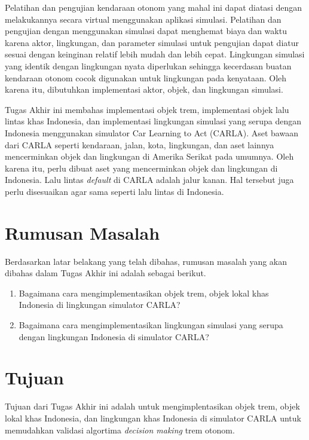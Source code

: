 Pelatihan dan pengujian kendaraan otonom yang mahal ini dapat diatasi dengan
melakukannya secara virtual menggunakan aplikasi simulasi. Pelatihan dan
pengujian dengan menggunakan simulasi dapat menghemat biaya dan waktu karena
aktor, lingkungan, dan parameter simulasi untuk pengujian dapat diatur sesuai
dengan keinginan relatif lebih mudah dan lebih cepat. Lingkungan simulasi yang
identik dengan lingkungan nyata diperlukan sehingga kecerdasan buatan kendaraan
otonom cocok digunakan untuk lingkungan pada kenyataan. Oleh karena itu,
dibutuhkan implementasi aktor, objek, dan lingkungan simulasi.

Tugas Akhir ini membahas implementasi objek trem, implementasi objek lalu lintas
khas Indonesia, dan implementasi lingkungan simulasi yang serupa dengan
Indonesia menggunakan simulator Car Learning to Act (CARLA). Aset bawaan dari
CARLA seperti kendaraan, jalan, kota, lingkungan, dan aset lainnya mencerminkan
objek dan lingkungan di Amerika Serikat pada umumnya. Oleh karena itu, perlu
dibuat aset yang mencerminkan objek dan lingkungan di Indonesia. Lalu lintas
\textit{default} di CARLA adalah jalur kanan. Hal tersebut juga perlu
disesuaikan agar sama seperti lalu lintas di Indonesia.

\section{Rumusan Masalah}

Berdasarkan latar belakang yang telah dibahas, rumusan masalah yang akan dibahas
dalam Tugas Akhir ini adalah sebagai berikut.

\begin{enumerate}

    \item Bagaimana cara mengimplementasikan objek trem, objek lokal khas
    Indonesia di lingkungan simulator CARLA?

    \item Bagaimana cara mengimplementasikan lingkungan simulasi yang serupa
    dengan lingkungan Indonesia di simulator CARLA?

\end{enumerate}

\section{Tujuan}

Tujuan dari Tugas Akhir ini adalah untuk mengimplentasikan objek trem, objek
lokal khas Indonesia, dan lingkungan khas Indonesia di simulator CARLA untuk
memudahkan validasi algortima \textit{decision making} trem otonom.


